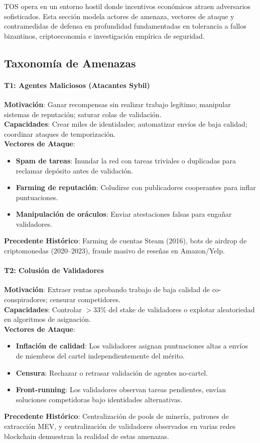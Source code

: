 \documentclass[11pt]{article}
\begin{document}
TOS opera en un entorno hostil donde incentivos económicos atraen adversarios sofisticados. Esta sección modela actores de amenaza, vectores de ataque y contramedidas de defensa en profundidad fundamentadas en tolerancia a fallos bizantinos, criptoeconomía e investigación empírica de seguridad.

\subsection{Taxonomía de Amenazas}

\paragraph{T1: Agentes Maliciosos (Atacantes Sybil)}
\textbf{Motivación}: Ganar recompensas sin realizar trabajo legítimo; manipular sistemas de reputación; saturar colas de validación.\\
\textbf{Capacidades}: Crear miles de identidades; automatizar envíos de baja calidad; coordinar ataques de temporización.\\
\textbf{Vectores de Ataque}:
\begin{itemize}[noitemsep]
  \item \textbf{Spam de tareas}: Inundar la red con tareas triviales o duplicadas para reclamar depósito antes de validación.
  \item \textbf{Farming de reputación}: Coludirse con publicadores cooperantes para inflar puntuaciones.
  \item \textbf{Manipulación de oráculos}: Enviar atestaciones falsas para engañar validadores.
\end{itemize}
\textbf{Precedente Histórico}: Farming de cuentas Steam (2016), bots de airdrop de criptomonedas (2020--2023), fraude masivo de reseñas en Amazon/Yelp.

\paragraph{T2: Colusión de Validadores}
\textbf{Motivación}: Extraer rentas aprobando trabajo de baja calidad de co-conspiradores; censurar competidores.\\
\textbf{Capacidades}: Controlar $>33\%$ del stake de validadores o explotar aleatoriedad en algoritmos de asignación.\\
\textbf{Vectores de Ataque}:
\begin{itemize}[noitemsep]
  \item \textbf{Inflación de calidad}: Los validadores asignan puntuaciones altas a envíos de miembros del cartel independientemente del mérito.
  \item \textbf{Censura}: Rechazar o retrasar validación de agentes no-cartel.
  \item \textbf{Front-running}: Los validadores observan tareas pendientes, envían soluciones competidoras bajo identidades alternativas.
\end{itemize}
\textbf{Precedente Histórico}: Centralización de pools de minería, patrones de extracción MEV, y centralización de validadores observados en varias redes blockchain demuestran la realidad de estas amenazas.
\end{document}
